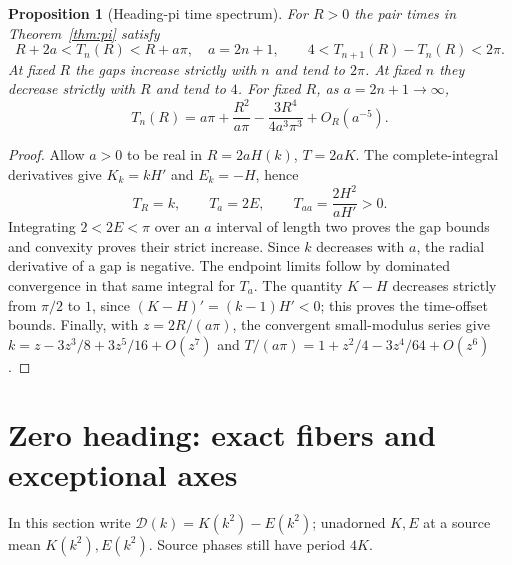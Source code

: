 \documentclass[11pt,a4paper]{article}
\newtheorem{proposition}[theorem]{Proposition}
\theoremstyle{remark}\newtheorem{remark}[theorem]{Remark}
\begin{document}
\begin{proposition}[Heading-pi time spectrum]\label{prop:pi-times}
For $R>0$ the pair times in Theorem~\ref{thm:pi} satisfy
\[
 R+2a<T_n(R)<R+a\pi,\quad a=2n+1,\qquad
 4<T_{n+1}(R)-T_n(R)<2\pi.
\]
At fixed $R$ the gaps increase strictly with $n$ and tend to $2\pi$.
At fixed $n$ they decrease strictly with $R$ and tend to $4$.
For fixed $R$, as $a=2n+1\to\infty$,
\[
 T_n(R)=a\pi+\frac{R^2}{a\pi}
           -\frac{3R^4}{4a^3\pi^3}+O_R(a^{-5}).
\]
\end{proposition}
\begin{proof}
Allow $a>0$ to be real in $R=2aH(k)$, $T=2aK$. The complete-integral
derivatives give $K_k=kH'$ and $E_k=-H$, hence
\[
 T_R=k,\qquad T_a=2E,\qquad
 T_{aa}=\frac{2H^2}{aH'}>0.
\]
Integrating $2<2E<\pi$ over an $a$ interval of length two proves the
gap bounds and convexity proves their strict increase. Since $k$ decreases
with $a$, the radial derivative of a gap is negative. The endpoint limits
follow by dominated convergence in that same integral for $T_a$.
The quantity $K-H$ decreases strictly from $\pi/2$ to $1$, since
$(K-H)'=(k-1)H'<0$; this proves the time-offset bounds.
Finally, with $z=2R/(a\pi)$, the convergent small-modulus series
\cite[Section 19.5]{DLMF} give
$k=z-3z^3/8+3z^5/16+O(z^7)$ and
$T/(a\pi)=1+z^2/4-3z^4/64+O(z^6)$.
\end{proof}

\section{Zero heading: exact fibers and exceptional axes}\label{sec:zero}

In this section write $\mathcal D(k)=K(k^2)-E(k^2)$; unadorned $K,E$
at a source mean $K(k^2),E(k^2)$. Source phases still have period $4K$.
\end{document}

